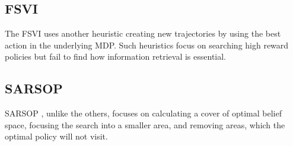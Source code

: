 \subsection{FSVI}
The FSVI \cite{fsvi} uses another heuristic creating new trajectories by using the best action in the underlying MDP. Such heuristics focus on searching high reward policies but fail to find how information retrieval is essential.


\subsection{SARSOP}
SARSOP \cite{sarsop}, unlike the others, focuses on calculating a cover of optimal belief space, focusing the search into a smaller area, and removing areas, which the optimal policy will not visit.


